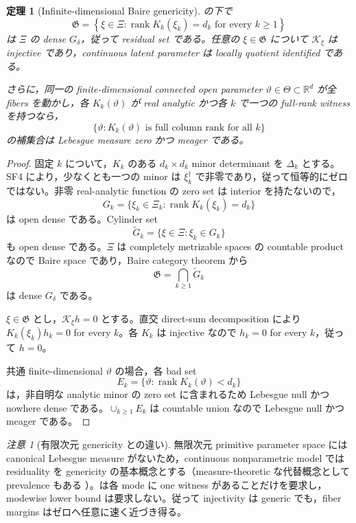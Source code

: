 \documentclass[11pt,a4paper]{ltjsarticle}
\newtheorem{theorem}{定理}[section]
\theoremstyle{remark}
\newtheorem{remark}{注意}[section]
\newcommand{\R}{\mathbb R}
\newcommand{\Kop}{\mathscr K}
\newcommand{\rank}{\operatorname{rank}}
\begin{document}
\begin{theorem}[Infinite-dimensional Baire genericity]\label{thm:bairespectralgeneric}
の下で
\begin{equation}
\mathfrak G
=\left\{\xi\in\Xi:
\rank K_k(\xi_k)=d_k\text{ for every }k\ge1
\right\}
\label{eq:residualG}
\end{equation}
は $\Xi$ の dense $G_\delta$，従って residual set である。任意の $\xi\in\mathfrak G$ について $\Kop_\xi$ は injective であり，continuous latent parameter は locally quotient identified である。

さらに，同一の finite-dimensional connected open parameter $\vartheta\in\Theta\subset\R^d$ が全 fibers を動かし，各 $K_k(\vartheta)$ が real analytic かつ各 $k$ で一つの full-rank witness を持つなら，
\[
\{\vartheta:K_k(\vartheta)\text{ is full column rank for all }k\}
\]
の補集合は Lebesgue measure zero かつ meager である。
\end{theorem}

\begin{proof}
固定 $k$ について，$K_k$ のある $d_k\times d_k$ minor determinant を $\Delta_k$ とする。SF4 により，少なくとも一つの minor は $\xi_k^\dagger$ で非零であり，従って恒等的にゼロではない。非零 real-analytic function の zero set は interior を持たないので，
\[
G_k=\{\xi_k\in\Xi_k:\rank K_k(\xi_k)=d_k\}
\]
は open dense である。Cylinder set
\[
\widetilde G_k
=\{\xi\in\Xi:\xi_k\in G_k\}
\]
も open dense である。$\Xi$ は completely metrizable spaces の countable product なので Baire space であり，Baire category theorem から
\[
\mathfrak G=\bigcap_{k\ge1}\widetilde G_k
\]
は dense $G_\delta$ である。

$\xi\in\mathfrak G$ とし，$\Kop_\xi h=0$ とする。直交 direct-sum decomposition により $K_k(\xi_k)h_k=0$ for every $k$。各 $K_k$ は injective なので $h_k=0$ for every $k$，従って $h=0$。

共通 finite-dimensional $\vartheta$ の場合，各 bad set
\[
E_k=\{\vartheta:\rank K_k(\vartheta)<d_k\}
\]
は，非自明な analytic minor の zero set に含まれるため Lebesgue null かつ nowhere dense である。$\cup_{k\ge1}E_k$ は countable union なので Lebesgue null かつ meager である。
\end{proof}

\begin{remark}[有限次元 genericity との違い]\label{rem:bairevslebesgue}
無限次元 primitive parameter space には canonical Lebesgue measure がないため，continuous nonparametric model では residuality を genericity の基本概念とする（measure-theoretic な代替概念として prevalence もある \cite{HuntSauerYorke1992}）。は各 mode に one witness があることだけを要求し，modewise lower bound は要求しない。従って injectivity は generic でも，fiber margins はゼロへ任意に速く近づき得る。
\end{remark}
\end{document}
